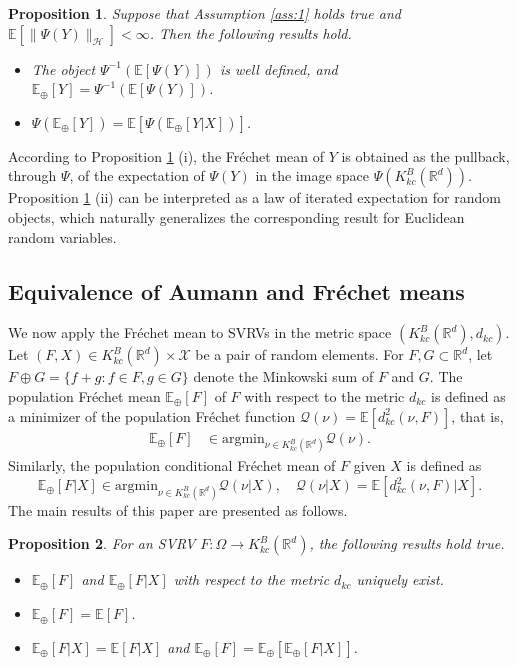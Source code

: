 \documentclass[11pt,reqno]{amsart}
\newtheorem{proposition}{Proposition}
\begin{document}
\begin{proposition}\label{prp:F-mean-embed}
Suppose that Assumption \ref{ass:1} holds true and $\mathbb{E}[\|\Psi(Y)\|_\mathcal{H}]<\infty$. Then the following results hold. 
\begin{itemize}
\item[(i)] The object $\Psi^{-1}(\mathbb{E}[\Psi(Y)])$ is well defined, and $\mathbb{E}_\oplus[Y]= \Psi^{-1}(\mathbb{E}[\Psi(Y)])$.  
\item[(ii)] $\Psi(\mathbb{E}_\oplus[Y]) = \mathbb{E}[\Psi(\mathbb{E}_\oplus[Y|X])]$.
\end{itemize}
\end{proposition}
According to Proposition \ref{prp:F-mean-embed} (i), the Fr\'echet mean of $Y$ is obtained as the pullback, through $\Psi$, of the expectation of $\Psi(Y)$ in the image space $\Psi(K_{kc}^B(\mathbb{R}^d))$. Proposition \ref{prp:F-mean-embed} (ii) can be interpreted as a law of iterated expectation for random objects, which naturally generalizes the corresponding result for Euclidean random variables.

\subsection{Equivalence of Aumann and Fr\'echet means}\label{sub:equiv}

We now apply the Fr\'echet mean to SVRVs in the metric space $(K_{kc}^B(\mathbb{R}^d),d_{kc})$. Let $(F,X) \in K_{kc}^B(\mathbb{R}^d) \times \mathcal{X}$ be a pair of random elements. For $F,G \subset \mathbb{R}^d$, let $F \oplus G=\{f+g: f \in F, g \in G\}$ denote the Minkowski sum of $F$ and $G$. The population Fr\'echet mean $\mathbb{E}_\oplus[F]$ of $F$ with respect to the metric $d_{kc}$ is defined as a minimizer of the population Fr\'echet function $\mathcal{Q}(\nu)=\mathbb{E}[d_{kc}^2(\nu,F)]$, that is,  
\begin{align*}
\mathbb{E}_\oplus[F] &\in  \mathrm{argmin}_{\nu \in K_{kc}^B(\mathbb{R}^d)}\mathcal{Q}(\nu).     
\end{align*}
Similarly, the population conditional Fr\'echet mean of $F$ given $X$ is defined as 
\[
\mathbb{E}_\oplus[F|X] \in  \mathrm{argmin}_{\nu \in K_{kc}^B(\mathbb{R}^d)}\mathcal{Q}(\nu|X), \quad \mathcal{Q}(\nu|X) = \mathbb{E}[d_{kc}^2(\nu,F)|X]. 
\]
The main results of this paper are presented as follows.
\begin{proposition}\label{prp: SVRV-exp-cexp}
For an SVRV $F:\Omega \to K_{kc}^B(\mathbb{R}^d)$, the following results hold true. 
\begin{itemize}
\item[(i)] $\mathbb{E}_\oplus[F]$ and $\mathbb{E}_\oplus[F|X]$ with respect to the metric $d_{kc}$ uniquely exist.
\item[(ii)] $\mathbb{E}_\oplus[F] = \mathbb{E}[F]$.
\item[(iii)] $\mathbb{E}_\oplus[F|X] = \mathbb{E}[F|X]$ and $\mathbb{E}_\oplus[F] = \mathbb{E}_\oplus[\mathbb{E}_\oplus[F|X]]$.   
\end{itemize}
\end{proposition}
\end{document}
